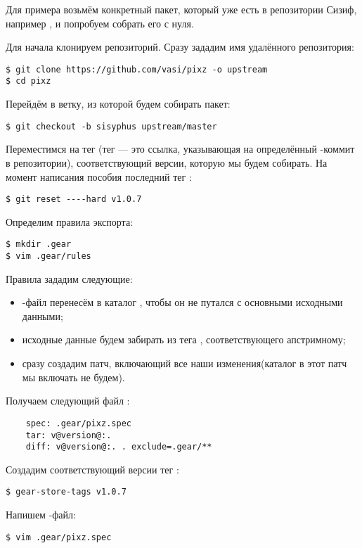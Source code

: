 
Для примера возьмём конкретный пакет, который уже есть в репозитории Сизиф, например , и попробуем
собрать его с нуля.

Для начала клонируем репозиторий. Сразу зададим имя удалённого репозитория:
\begin{verbatim}
$ git clone https://github.com/vasi/pixz -o upstream
$ cd pixz
\end{verbatim}

Перейдём в ветку, из которой будем собирать пакет:
\begin{verbatim}
$ git checkout -b sisyphus upstream/master
\end{verbatim}

Переместимся на тег (тег --- это ссылка, указывающая на определённый -коммит в репозитории),
соответствующий версии, которую мы будем собирать. На момент написания пособия последний тег :
\begin{verbatim}
$ git reset ----hard v1.0.7
\end{verbatim}

Определим правила экспорта:
\begin{verbatim}
$ mkdir .gear
$ vim .gear/rules
\end{verbatim}

Правила зададим следующие:
\begin{itemize}
	\item {}-файл перенесём в каталог , чтобы он не путался с основными исходными данными;
	\item исходные данные будем забирать из тега , соответствующего апстримному;
	\item сразу создадим патч, включающий все наши изменения(каталог  в этот патч мы включать не будем).
\end{itemize}

Получаем следующий файл :
\begin{verbatim}
    spec: .gear/pixz.spec
    tar: v@version@:.
    diff: v@version@:. . exclude=.gear/**
\end{verbatim}

Создадим соответствующий версии тег :
\begin{verbatim}
$ gear-store-tags v1.0.7
\end{verbatim}

Напишем -файл:
\begin{verbatim}
$ vim .gear/pixz.spec
\end{verbatim}

